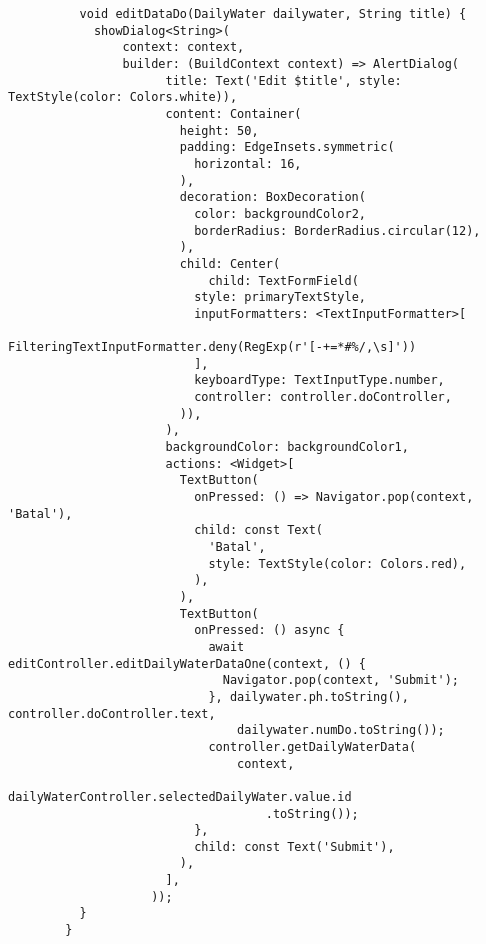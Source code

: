 \begin{lstlisting}
          void editDataDo(DailyWater dailywater, String title) {
            showDialog<String>(
                context: context,
                builder: (BuildContext context) => AlertDialog(
                      title: Text('Edit $title', style: TextStyle(color: Colors.white)),
                      content: Container(
                        height: 50,
                        padding: EdgeInsets.symmetric(
                          horizontal: 16,
                        ),
                        decoration: BoxDecoration(
                          color: backgroundColor2,
                          borderRadius: BorderRadius.circular(12),
                        ),
                        child: Center(
                            child: TextFormField(
                          style: primaryTextStyle,
                          inputFormatters: <TextInputFormatter>[
                            FilteringTextInputFormatter.deny(RegExp(r'[-+=*#%/,\s]'))
                          ],
                          keyboardType: TextInputType.number,
                          controller: controller.doController,
                        )),
                      ),
                      backgroundColor: backgroundColor1,
                      actions: <Widget>[
                        TextButton(
                          onPressed: () => Navigator.pop(context, 'Batal'),
                          child: const Text(
                            'Batal',
                            style: TextStyle(color: Colors.red),
                          ),
                        ),
                        TextButton(
                          onPressed: () async {
                            await editController.editDailyWaterDataOne(context, () {
                              Navigator.pop(context, 'Submit');
                            }, dailywater.ph.toString(), controller.doController.text,
                                dailywater.numDo.toString());
                            controller.getDailyWaterData(
                                context,
                                dailyWaterController.selectedDailyWater.value.id
                                    .toString());
                          },
                          child: const Text('Submit'),
                        ),
                      ],
                    ));
          }
        }        
	\end{lstlisting}

